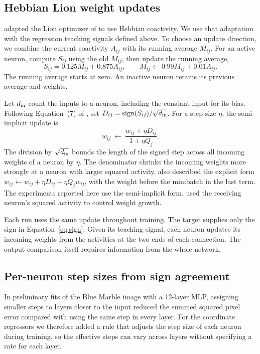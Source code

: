 \documentclass[10pt]{article}
\DeclareMathOperator{\sgn}{sign}
\begin{document}
\subsection{Hebbian Lion weight updates}
\citet{loverich2026} adapted the Lion optimizer of \citet{chen2023} to use Hebbian coactivity. We use that adaptation with the regression teaching signals defined above. To choose an update direction, we combine the current coactivity $A_{ij}$ with its running average $M_{ij}$. For an active neuron, compute $S_{ij}$ using the old $M_{ij}$, then update the running average,
\begin{equation}
 S_{ij}=0.125 M_{ij}+0.875 A_{ij},\qquad
 M_{ij}\leftarrow 0.99 M_{ij}+0.01 A_{ij}.
 \label{eq:history}
\end{equation}
The running average starts at zero. An inactive neuron retains its previous average and weights.

Let $d_{\rm in}$ count the inputs to a neuron, including the constant input for its bias. Following Equation~(7) of \citet{loverich2026}, set $D_{ij}=\sgn(S_{ij})/\sqrt{d_{\rm in}}$. For a step size $\eta$, the semi-implicit update is
\begin{equation}
 w_{ij}\ \leftarrow\
 \frac{w_{ij}+\eta D_{ij}}{1+\eta Q_j}.
 \label{eq:update}
\end{equation}
The division by $\sqrt{d_{\rm in}}$ bounds the length of the signed step across all incoming weights of a neuron by $\eta$. The denominator shrinks the incoming weights more strongly at a neuron with larger squared activity. \citet{loverich2026} also described the explicit form $w_{ij}\leftarrow w_{ij}+\eta D_{ij}-\eta Q_j w_{ij}$, with the weight before the minibatch in the last term. The experiments reported here use the semi-implicit form. \citet{oja1982} used the receiving neuron's squared activity to control weight growth.

Each run uses the same update throughout training. The target supplies only the sign in Equation~\ref{eq:sign}. Given its teaching signal, each neuron updates its incoming weights from the activities at the two ends of each connection. The output comparison itself requires information from the whole network.

\subsection{Per-neuron step sizes from sign agreement}
In preliminary fits of the Blue Marble image with a 12-layer MLP, assigning smaller steps to layers closer to the input reduced the summed squared pixel error compared with using the same step in every layer. For the coordinate regressors we therefore added a rule that adjusts the step size of each neuron during training, so the effective steps can vary across layers without specifying a rate for each layer.
\end{document}
